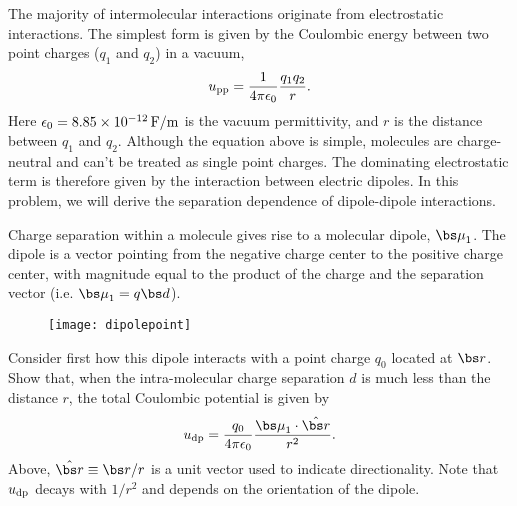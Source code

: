 \def\bmu{{\bs \mu}}
\def\hmu{{\hat{\bs \mu}}}\def\hr{{\hat{\bs r}}}
The majority of intermolecular interactions originate from electrostatic interactions.
The simplest form is given by the Coulombic energy between 
two point charges ($q_1$ and $q_2$) in a vacuum,
\[ u_{\rm pp} = \frac{1}{4\pi\epsilon_0} \frac{q_1 q_2}{r} .\]
Here $\epsilon_0 = 8.85\times10^{-12}\rm\,F/m$ is the vacuum permittivity,
and $r$ is the distance between $q_1$ and $q_2$.
Although the equation above is simple,
molecules are charge-neutral and can't be
treated as single point charges. 
The dominating electrostatic term is therefore
given by the interaction between electric dipoles.
In this problem, we will derive the separation dependence
of dipole-dipole interactions.

\smallskip \subp
Charge separation within a molecule gives rise to a molecular dipole, $\bmu_1$.
The dipole is a vector pointing from the negative charge center
to the positive charge center, with magnitude equal to
the product of the charge and 
the separation vector (i.e. $\bmu_1 = q \bs d$).
\begin{figure}[h]\centering
\texttt{[image: dipolepoint]}
\end{figure}
Consider first how this dipole interacts 
with a point charge $q_0$ located at $\bs r$.
Show that, when the intra-molecular charge separation $d$ is much
less than the distance $r$,
the total Coulombic potential is given by
$$ u_{\rm dp} = \frac{q_0}{4\pi\epsilon_0} \frac{\bmu_1 \cdot \hat{\bs r}}{r^2} .$$
Above, $\hat{\bs r} \equiv {\bs r} / r$ is a unit vector used to indicate directionality.
Note that $u_{\rm dp}$ decays with $1/r^2$ and 
depends on the orientation of the dipole. 
